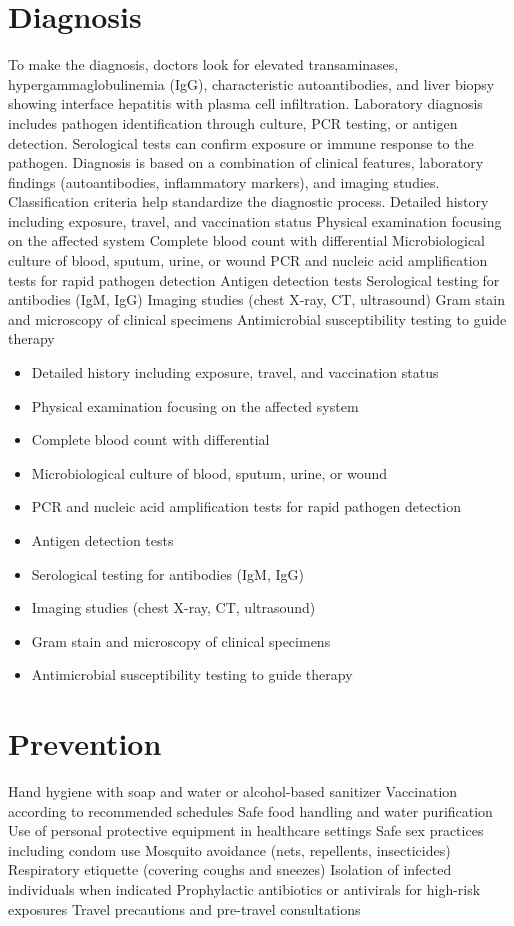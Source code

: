 \section{Diagnosis}
To make the diagnosis, doctors look for elevated transaminases, hypergammaglobulinemia (IgG), characteristic autoantibodies, and liver biopsy showing interface hepatitis with plasma cell infiltration. Laboratory diagnosis includes pathogen identification through culture, PCR testing, or antigen detection. Serological tests can confirm exposure or immune response to the pathogen. Diagnosis is based on a combination of clinical features, laboratory findings (autoantibodies, inflammatory markers), and imaging studies. Classification criteria help standardize the diagnostic process. Detailed history including exposure, travel, and vaccination status Physical examination focusing on the affected system Complete blood count with differential Microbiological culture of blood, sputum, urine, or wound PCR and nucleic acid amplification tests for rapid pathogen detection Antigen detection tests Serological testing for antibodies (IgM, IgG) Imaging studies (chest X-ray, CT, ultrasound) Gram stain and microscopy of clinical specimens Antimicrobial susceptibility testing to guide therapy

\begin{itemize}[noitemsep]
  \item Detailed history including exposure, travel, and vaccination status
  \item Physical examination focusing on the affected system
  \item Complete blood count with differential
  \item Microbiological culture of blood, sputum, urine, or wound
  \item PCR and nucleic acid amplification tests for rapid pathogen detection
  \item Antigen detection tests
  \item Serological testing for antibodies (IgM, IgG)
  \item Imaging studies (chest X-ray, CT, ultrasound)
  \item Gram stain and microscopy of clinical specimens
  \item Antimicrobial susceptibility testing to guide therapy
\end{itemize}
\section{Prevention}
Hand hygiene with soap and water or alcohol-based sanitizer Vaccination according to recommended schedules Safe food handling and water purification Use of personal protective equipment in healthcare settings Safe sex practices including condom use Mosquito avoidance (nets, repellents, insecticides) Respiratory etiquette (covering coughs and sneezes) Isolation of infected individuals when indicated Prophylactic antibiotics or antivirals for high-risk exposures Travel precautions and pre-travel consultations

